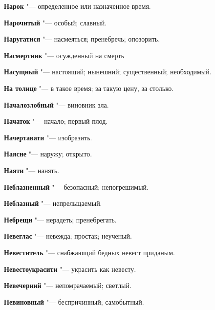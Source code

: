 \begin{mymulticols}{2}
\noindent\textbf{Нарок} "--- определенное или назначенное время. 




\noindent\textbf{Нарочитый} "--- особый; славный. 




\noindent\textbf{Наругатися} "--- насмеяться; пренебречь; опозорить. 




\noindent\textbf{Насмертник} "--- осужденный на смерть 




\noindent\textbf{Насущный} "--- настоящий; нынешний; существенный; необходимый. 




\noindent\textbf{На толице} "--- в такое время; за такую цену, за столько. 




\noindent\textbf{Началозлобный} "--- виновник зла. 




\noindent\textbf{Начаток} "--- начало; первый плод. 




\noindent\textbf{Начертавати} "--- изобразить. 




\noindent\textbf{Наясне} "--- наружу; открыто. 




\noindent\textbf{Наяти} "--- нанять. 




\noindent\textbf{Неблазненный} "--- безопасный; непогрешимый. 




\noindent\textbf{Неблазный} "--- непрельщаемый. 




\noindent\textbf{Небрещи} "--- нерадеть; пренебрегать. 




\noindent\textbf{Невеглас} "--- невежда; простак; неученый. 




\noindent\textbf{Невеститель} "--- снабжающий бедных невест приданым. 




\noindent\textbf{Невестоукрасити} "--- украсить как невесту. 




\noindent\textbf{Невечерний} "--- непомрачаемый; светлый. 




\noindent\textbf{Невиновный} "--- беспричинный; самобытный. 





\end{mymulticols}
